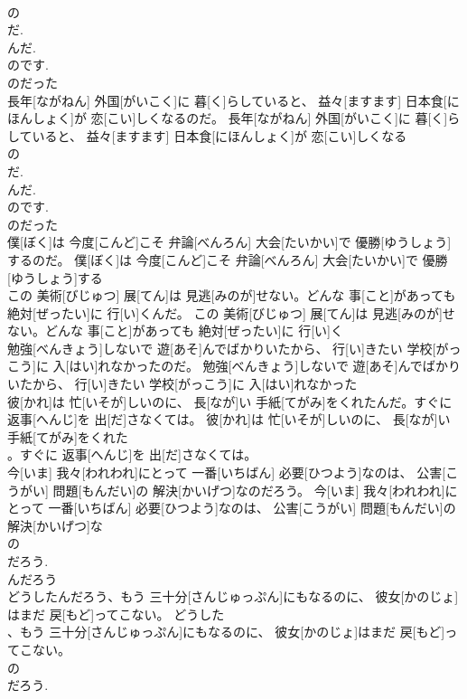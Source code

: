 \documentclass[8pt]{extreport}
\begin{document}
\begin{CJK}{UTF8}{min}
\\	の 
\\	だ. 
\\	んだ. 
\\	のです. 
\\	のだった
\\	長年[ながねん] 外国[がいこく]に 暮[く]らしていると、 益々[ますます] 日本食[にほんしょく]が 恋[こい]しくなるのだ。	長年[ながねん] 外国[がいこく]に 暮[く]らしていると、 益々[ますます] 日本食[にほんしょく]が 恋[こい]しくなる
\\	の 
\\	だ. 
\\	んだ. 
\\	のです. 
\\	のだった
\\	僕[ぼく]は 今度[こんど]こそ 弁論[べんろん] 大会[たいかい]で 優勝[ゆうしょう]するのだ。	僕[ぼく]は 今度[こんど]こそ 弁論[べんろん] 大会[たいかい]で 優勝[ゆうしょう]する
\\	この 美術[びじゅつ] 展[てん]は 見逃[みのが]せない。どんな 事[こと]があっても 絶対[ぜったい]に 行[い]くんだ。	この 美術[びじゅつ] 展[てん]は 見逃[みのが]せない。どんな 事[こと]があっても 絶対[ぜったい]に 行[い]く
\\	勉強[べんきょう]しないで 遊[あそ]んでばかりいたから、 行[い]きたい 学校[がっこう]に 入[はい]れなかったのだ。	勉強[べんきょう]しないで 遊[あそ]んでばかりいたから、 行[い]きたい 学校[がっこう]に 入[はい]れなかった
\\	彼[かれ]は 忙[いそが]しいのに、 長[なが]い 手紙[てがみ]をくれたんだ。すぐに 返事[へんじ]を 出[だ]さなくては。	彼[かれ]は 忙[いそが]しいのに、 長[なが]い 手紙[てがみ]をくれた
\\	。すぐに 返事[へんじ]を 出[だ]さなくては。	
\\	今[いま] 我々[われわれ]にとって 一番[いちばん] 必要[ひつよう]なのは、 公害[こうがい] 問題[もんだい]の 解決[かいげつ]なのだろう。	今[いま] 我々[われわれ]にとって 一番[いちばん] 必要[ひつよう]なのは、 公害[こうがい] 問題[もんだい]の 解決[かいげつ]な
\\	の 
\\	だろう. 
\\	んだろう
\\	どうしたんだろう、もう 三十分[さんじゅっぷん]にもなるのに、 彼女[かのじょ]はまだ 戻[もど]ってこない。	どうした
\\	、もう 三十分[さんじゅっぷん]にもなるのに、 彼女[かのじょ]はまだ 戻[もど]ってこない。	
\\	の 
\\	だろう. 

\end{CJK}
\end{document}
